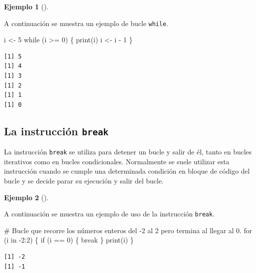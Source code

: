 \documentclass[
  a4paper,
]{scrreport}
\newenvironment{Shaded}{\begin{snugshade}}{\end{snugshade}}
\newcommand{\CommentTok}[1]{\textcolor[rgb]{0.37,0.37,0.37}{#1}}
\newcommand{\ControlFlowTok}[1]{\textcolor[rgb]{0.00,0.23,0.31}{#1}}
\newcommand{\DecValTok}[1]{\textcolor[rgb]{0.68,0.00,0.00}{#1}}
\newcommand{\FunctionTok}[1]{\textcolor[rgb]{0.28,0.35,0.67}{#1}}
\newcommand{\NormalTok}[1]{\textcolor[rgb]{0.00,0.23,0.31}{#1}}
\newcommand{\OtherTok}[1]{\textcolor[rgb]{0.00,0.23,0.31}{#1}}
\newcommand{\SpecialCharTok}[1]{\textcolor[rgb]{0.37,0.37,0.37}{#1}}
\theoremstyle{definition}
\theoremstyle{definition}
\newtheorem{example}{Ejemplo}[chapter]
\theoremstyle{remark}
\begin{document}
\leavevmode{}%
\begin{example}[]\label{exm-bucle-condicional}

A continuación se muestra un ejemplo de bucle \texttt{while}.

\begin{Shaded}
\begin{Highlighting}[]
\NormalTok{i }\OtherTok{\textless{}{-}} \DecValTok{5}
\ControlFlowTok{while}\NormalTok{ (i }\SpecialCharTok{\textgreater{}=} \DecValTok{0}\NormalTok{) \{}
  \FunctionTok{print}\NormalTok{(i)}
\NormalTok{  i }\OtherTok{\textless{}{-}}\NormalTok{ i }\SpecialCharTok{{-}} \DecValTok{1}
\NormalTok{\}}
\end{Highlighting}
\end{Shaded}

\begin{verbatim}
[1] 5
[1] 4
[1] 3
[1] 2
[1] 1
[1] 0
\end{verbatim}

\end{example}

\hypertarget{la-instrucciuxf3n-break}{%
\subsection{\texorpdfstring{La instrucción
\texttt{break}}{La instrucción break}}\label{la-instrucciuxf3n-break}}

La instrucción \texttt{break} se utiliza para detener un bucle y salir
de él, tanto en bucles iterativos como en bucles condicionales.
Normalmente se suele utilizar esta instrucción cuando se cumple una
determinada condición en bloque de código del bucle y se decide parar su
ejecución y salir del bucle.

\leavevmode{}%
\begin{example}[]\label{exm-salida-bucle-break}

A continuación se muestra un ejemplo de uso de la instrucción
\texttt{break}.

\begin{Shaded}
\begin{Highlighting}[]
\CommentTok{\# Bucle que recorre los números enteros del {-}2 al 2 pero termina al llegar al 0.}
\ControlFlowTok{for}\NormalTok{ (i }\ControlFlowTok{in} \SpecialCharTok{{-}}\DecValTok{2}\SpecialCharTok{:}\DecValTok{2}\NormalTok{) \{}
  \ControlFlowTok{if}\NormalTok{ (i }\SpecialCharTok{==} \DecValTok{0}\NormalTok{) \{}
    \ControlFlowTok{break}
\NormalTok{  \} }
  \FunctionTok{print}\NormalTok{(i)}
\NormalTok{\}}
\end{Highlighting}
\end{Shaded}

\begin{verbatim}
[1] -2
[1] -1
\end{verbatim}

\end{example}
\end{document}
